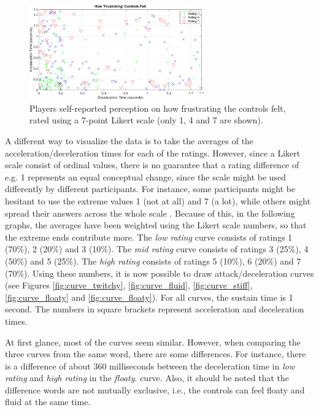 \begin{figure}[htbp]
\centering
\includegraphics[width=0.67\textwidth]{Pics/Classes/Frustration_classes}
\caption{Players self-reported perception on how frustrating the controls felt, rated using a 7-point Likert scale (only 1, 4 and 7 are shown).}
\label{fig:frustration}
\end{figure}

A different way to visualize the data is to take the averages of the acceleration/deceleration times for each of the ratings. However, since a Likert scale consist of ordinal values, there is no guarantee that a rating difference of e.g. 1 represents an equal conceptual change, since the scale might be used differently by different participants. For instance, some participants might be hesitant to use the extreme values 1 (not at all) and 7 (a lot), while others might spread their answers across the whole scale \cite{cunningham}. Because of this, in the following graphs, the averages have been weighted using the Likert scale numbers, so that the extreme ends contribute more. The \textit{low rating} curve consists of ratings 1 (70\%), 2 (20\%) and 3 (10\%). The \textit{mid rating} curve consists of ratings 3 (25\%), 4 (50\%) and 5 (25\%). The \textit{high rating} consists of ratings 5 (10\%), 6 (20\%) and 7 (70\%). Using these numbers, it is now possible to draw attack/deceleration curves (see Figures \ref{fig:curve_twitchy}, \ref{fig:curve_fluid}, \ref{fig:curve_stiff}, \ref{fig:curve_floaty} and \ref{fig:curve_floaty}). For all curves, the sustain time is 1 second. The numbers in square brackets represent acceleration and deceleration times.

At first glance, most of the curves seem similar. However, when comparing the three curves from the same word, there are some differences. For instance, there is a difference of about 360 milliseconds between the deceleration time in \textit{low rating} and \textit{high rating} in the \textit{floaty}. curve. Also, it should be noted that the difference words are not mutually exclusive, i.e., the controls can feel floaty and fluid at the same time.


